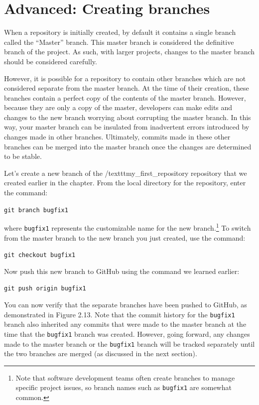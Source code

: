 \documentclass{book}
\begin{document}
\section{Advanced: Creating branches}
When a repository is initially created, by default it contains a single branch called the ``Master'' branch. This master branch is considered the definitive branch of the project. As such, with larger projects, changes to the master branch should be considered carefully.

However, it is possible for a repository to contain other branches which are not considered separate from the master branch. At the time of their creation, these branches contain a perfect copy of the contents of the master branch. However, because they are only a copy of the master, developers can make edits and changes to the new branch worrying about corrupting the master branch. In this way, your master branch can be insulated from inadvertent errors introduced by changes made in other branches. Ultimately, commits made in these other branches can be merged into the master branch once the changes are determined to be stable.

Let's create a new branch of the /texttt{my\_first\_repository} repository that we created earlier in the chapter. From the local directory for the repository, enter the command:

\texttt{git branch bugfix1}

where \texttt{bugfix1} represents the customizable name for the new branch.\footnote{Note that software development teams often create branches to manage specific project issues, so branch names such as \texttt{bugfix1} are somewhat common.} To switch from the master branch to the new branch you just created, use the command:

\texttt{git checkout bugfix1}

Now push this new branch to GitHub using the command we learned earlier:

\texttt{git push origin bugfix1} 

You can now verify that the separate branches have been pushed to GitHub, as demonstrated in Figure 2.13. Note that the commit history for the \texttt{bugfix1} branch also inherited any commits that were made to the master branch at the time that the \texttt{bugfix1} branch was created. However, going forward, any changes made to the master branch or the \texttt{bugfix1} branch will be tracked separately until the two branches are merged (as discussed in the next section).
\end{document}
